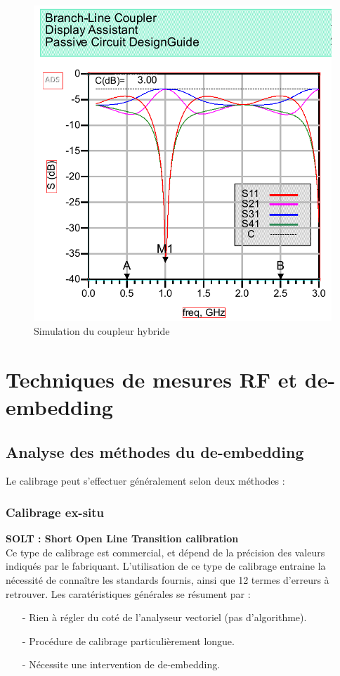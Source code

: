\documentclass[a4paper]{article}
\begin{document}
\begin{figure}[!htb]
\begin{center}
  \includegraphics[scale=0.35]{Coupleur-Simulation-resultat.png}
  \caption{Simulation du coupleur hybride}
  \label{Coupleur-Simulation-resultat}
\end{center}
\end{figure}


\clearpage
\section{Techniques de mesures RF et de-embedding}
\subsection{Analyse des m\'ethodes du de-embedding}
Le calibrage peut s'effectuer g\'en\'eralement selon deux m\'ethodes :

\subsubsection{Calibrage ex-situ}
\textbf{SOLT : Short Open Line Transition calibration} \\
Ce type de calibrage est commercial, et d\'epend de la pr\'ecision des valeurs indiqu\'es par le fabriquant.
L'utilisation de ce type de calibrage entraine la n\'ecessit\'e de conna\^itre les standards fournis, ainsi
que 12 termes d'erreurs \`a retrouver.
Les carat\'eristiques g\'en\'erales se r\'esument par :
\begin{itemize}
  \item[-] Rien \`a r\'egler du cot\'e de l'analyseur vectoriel (pas d'algorithme).
  \item[-] Proc\'edure de calibrage particuli\`erement longue.
  \item[-] N\'ecessite une intervention de de-embedding.
\end{itemize}
\end{document}

